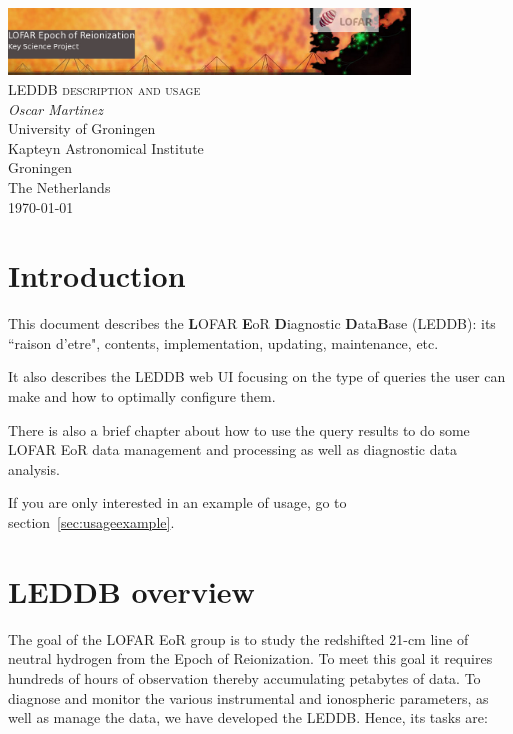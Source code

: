 \documentclass[a4paper,11pt]{article}
\begin{document}
\begin{titlepage}
\begin{center}
\includegraphics[width=0.8\textwidth]{fig/eorlogo}\\[3cm]    
\textsc{\LARGE LEDDB description and usage}\\[0.5cm]
\vfill
{\large 
\emph{Oscar Martinez} \\
University of Groningen \\ 
Kapteyn Astronomical Institute \\
Groningen \\
The Netherlands \\
\today}
\end{center}
\end{titlepage}

\tableofcontents
\newpage


\section {Introduction}

This document describes the \textbf{L}OFAR \textbf{E}oR \textbf{D}iagnostic \textbf{D}ata\textbf{B}ase (LEDDB): its ``raison d'etre", contents, implementation, updating, maintenance, etc. 

It also describes the LEDDB web UI focusing on the type of queries the user can make and how to optimally configure them. 

There is also a brief chapter about how to use the query results to do some LOFAR EoR data management and processing as well as diagnostic data analysis. 

If you are only interested in an example of usage, go to section~\ref{sec:usageexample}.

\section {LEDDB overview}

The goal of the LOFAR EoR group is to study the redshifted 21-cm line of neutral hydrogen from the Epoch of Reionization. To meet this goal it requires hundreds of hours of observation thereby accumulating petabytes of data. To diagnose and monitor the various instrumental and ionospheric parameters, as well as manage the data, we have developed the LEDDB. Hence, its tasks are:
\end{document}
